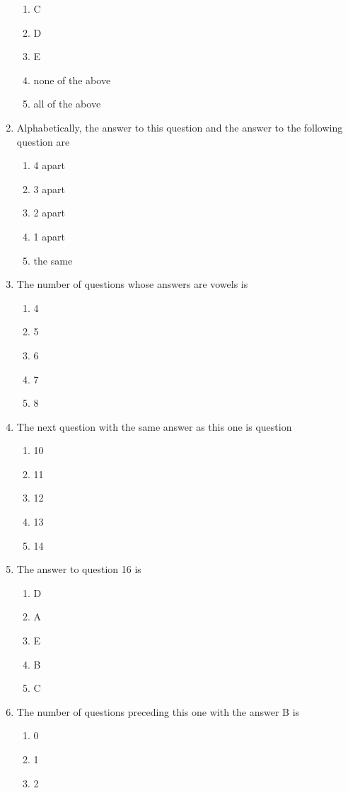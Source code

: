 \documentclass[twoside]{article}
\begin{document}
\begin{enumerate}
\begin{enumerate}[label=(\Alph*)]
	\item C
	\item D
	\item E
	\item none of the above
	\item all of the above
	\end{enumerate}
\item Alphabetically, the answer to this question and the answer to the following question are
	\begin{enumerate}[label=(\Alph*)]
	\item 4 apart
	\item 3 apart
	\item 2 apart
	\item 1 apart
	\item the same
	\end{enumerate}
\item The number of questions whose answers are vowels is
	\begin{enumerate}[label=(\Alph*)]
	\item 4
	\item 5
	\item 6
	\item 7
	\item 8
	\end{enumerate}
\item The next question with the same answer as this one is question
	\begin{enumerate}[label=(\Alph*)]
	\item 10
	\item 11
	\item 12
	\item 13
	\item 14
	\end{enumerate}
\item The answer to question 16 is
	\begin{enumerate}[label=(\Alph*)]
	\item D
	\item A
	\item E
	\item B
	\item C
	\end{enumerate}
\newpage
\item The number of questions preceding this one with the answer B is
	\begin{enumerate}[label=(\Alph*)]
	\item 0
	\item 1
	\item 2

\end{enumerate}
\end{enumerate}
\end{document}
